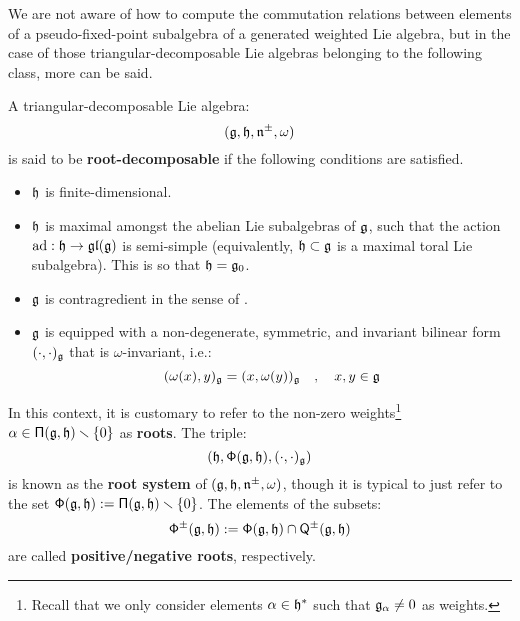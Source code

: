         We are not aware of how to compute the commutation relations between elements of a pseudo-fixed-point subalgebra of a generated weighted Lie algebra, but in the case of those triangular-decomposable Lie algebras belonging to the following class, more can be said.
        \begin{definition} \label{def: root_decomposable_lie_algebras}
            A triangular-decomposable Lie algebra:
                $$(\mathfrak{g}, \mathfrak{h}, \mathfrak{n}^{\pm}, \omega)$$
            is said to be \textbf{root-decomposable} if the following conditions are satisfied.
            \begin{itemize}
                \item $\mathfrak{h}$ is finite-dimensional.
                \item $\mathfrak{h}$ is maximal amongst the abelian Lie subalgebras of $\mathfrak{g}$, such that the action $\mathrm{ad}: \mathfrak{h} \to \mathfrak{gl}(\mathfrak{g})$ is semi-simple (equivalently, $\mathfrak{h} \subset \mathfrak{g}$ is a maximal toral Lie subalgebra). This is so that $\mathfrak{h} = \mathfrak{g}_0$.
                \item $\mathfrak{g}$ is contragredient in the sense of \cite[Section 4.1]{moody_pianzola_lie_algebras_with_triangular_decompositions}.
                \item $\mathfrak{g}$ is equipped with a non-degenerate, symmetric, and invariant bilinear form $(\cdot, \cdot)_{\mathfrak{g}}$ that is $\omega$-invariant, i.e.:
                    \begin{equation} \label{equation: cartan_invariant_pairing_on_root_decomposable_lie_algebras}
                        (\omega(x), y)_{\mathfrak{g}} = (x, \omega(y))_{\mathfrak{g}} \quad, \quad x, y \in \mathfrak{g}
                    \end{equation}
            \end{itemize}
        \end{definition}
        \begin{convention}
            In this context, it is customary to refer to the non-zero weights\footnote{Recall that we only consider elements $\alpha \in \mathfrak{h}^*$ such that $\mathfrak{g}_{\alpha} \not = 0$ as weights.} $\alpha \in \mathsf{\Pi}(\mathfrak{g}, \mathfrak{h}) \smallsetminus \{0\}$ as \textbf{roots}. The triple:
                $$( \mathfrak{h}, \mathsf{\Phi}(\mathfrak{g}, \mathfrak{h}), (\cdot, \cdot)_{\mathfrak{g}} )$$
            is known as the \textbf{root system} of $(\mathfrak{g}, \mathfrak{h}, \mathfrak{n}^{\pm}, \omega)$, though it is typical to just refer to the set $\mathsf{\Phi}(\mathfrak{g}, \mathfrak{h}) := \mathsf{\Pi}(\mathfrak{g}, \mathfrak{h}) \smallsetminus \{0\}$. The elements of the subsets:
                $$\mathsf{\Phi}^{\pm}(\mathfrak{g}, \mathfrak{h}) := \mathsf{\Phi}(\mathfrak{g}, \mathfrak{h}) \cap \mathsf{Q}^{\pm}(\mathfrak{g}, \mathfrak{h})$$
            are called \textbf{positive/negative roots}, respectively.
        \end{convention}
